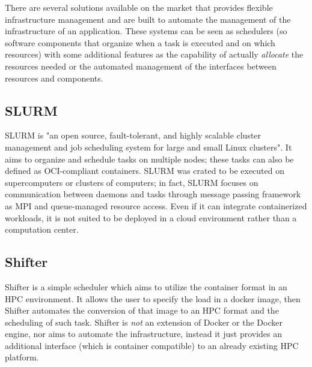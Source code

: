 There are several solutions available on the market that provides flexible infrastructure management and are built to automate the management of the infrastructure of an application. These systems can be seen as schedulers (so software components that organize when a task is executed and on which resources) with some additional features as the capability of actually \textit{allocate} the resources needed or the automated management of the interfaces between resources and components.

\subsection{SLURM}
\label{sse:slurm}
  SLURM is "an open source, fault-tolerant, and highly scalable cluster management and job scheduling system for large and small Linux clusters"\cite{slurm}. It aims to organize and schedule tasks on multiple nodes; these tasks can also be defined as OCI-compliant containers. SLURM was crated to be executed on supercomputers or clusters of computers; in fact, SLURM focuses on communication between daemons and tasks through message passing framework as MPI and queue-managed resource access. Even if it can integrate containerized workloads, it is not suited to be deployed in a cloud environment rather than a computation center.

\subsection{Shifter}
\label{sse:shifter}
  Shifter is a simple scheduler which aims to utilize the container format in an HPC environment. It allows the user to specify the load in a docker image, then Shifter automates the conversion of that image to an HPC format and the scheduling of such task. Shifter is \textit{not} an extension of Docker or the Docker engine, nor aims to automate the infrastructure, instead it just provides an additional interface (which is container compatible) to an already existing HPC platform.

